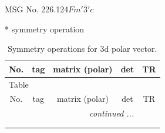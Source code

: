 \documentclass[fleqn,8pt]{jsarticle}
\begin{document}
\setcounter{MaxMatrixCols}{32}

\renewcommand{\tablename}{Table~}
\renewcommand{\figurename}{Figure~}
\begin{center}
\LARGE
MSG No. 226.124\quad$Fm'\bar{3}'c$
\end{center}
* symmetry operation
\renewcommand{\arraystretch}{1.3}
\begin{longtable}{ccccc}
\caption{Symmetry operations for 3d polar vector.}
 \\
 \hline \hline
No. & tag & matrix (polar) & det & TR \\ \hline \endfirsthead

\multicolumn{4}{l}{\tablename\ \thetable{}} \\
 \hline \hline
No. & tag & matrix (polar) & det & TR \\ \hline \endhead

 \hline \hline
\multicolumn{4}{r}{\footnotesize\it continued ...} \\ \endfoot

 \hline \hline
\multicolumn{4}{r}{} \\ \endlastfoot


\end{longtable}
\end{document}
